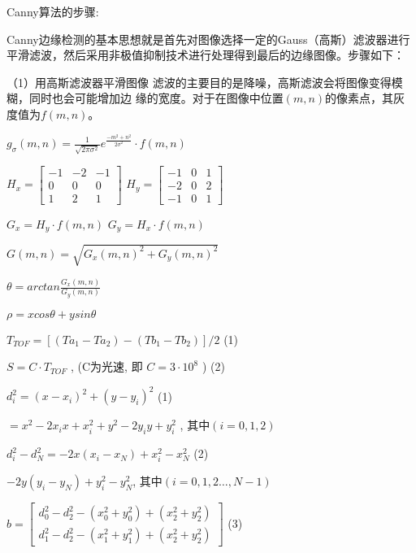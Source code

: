 Canny算法的步骤:

Canny边缘检测的基本思想就是首先对图像选择一定的Gauss（高斯）滤波器进行平滑滤波，然后采用非极值抑制技术进行处理得到最后的边缘图像。步骤如下：

（1）用高斯滤波器平滑图像
滤波的主要目的是降噪，高斯滤波会将图像变得模糊，同时也会可能增加边
缘的宽度。对于在图像中位置$(m,n)$的像素点，其灰度值为$f(m,n)$。

\bf{$g_{\sigma}(m,n) = \frac{1}{\sqrt{2\pi\sigma^2}} e^{\frac{-m^2+n^2}{2{\sigma^2}}} \cdot f(m,n) $}


$H_x = \begin{bmatrix} -1 & -2 & -1 \\ 0 & 0 & 0  \\ 1 & 2 & 1\end{bmatrix}$ \quad{}
$H_y = \begin{bmatrix} -1 & 0 & 1 \\ -2 & 0 & 2  \\ -1 & 0 & 1\end{bmatrix}$

$ G_x = H_y \cdot f(m,n)$ \quad{} $ G_y = H_x \cdot f(m,n)$


$G(m,n) = \sqrt{G_x(m,n) ^2 + G_y(m,n)^2}$

$\theta = arctan \frac{G_x(m,n)}{G_y(m,n)} $

\quad{}

$\rho = xcos \theta +ysin \theta$

\quad{}

$T_{TOF} =[(Ta_1 - Ta_2) - (Tb_1 - Tb_2)] /2 $ \quad{}\quad{}(1)

\quad{}

$ S= C \cdot T_{TOF}$ , \quad{}(C为光速, 即 $C=3\cdot 10^8$ ) \quad{}\quad{}(2)

\quad{}

$d_i^2 = (x - x_i)^2 + (y - y_i)^2 $ \quad{}\quad{}(1)

\quad$ = x^2 -2x_ix + x_i^2 + y^2 - 2y_iy + y_i^2$ , \quad{}其中$(i = 0,1,2)$

\quad

$d_i^2 - d_N^2 = -2x(x_i - x_N) + x_i^2 -x_N^2 $ \quad{}\quad{}(2)

\quad\quad\quad\quad{} $- 2y(y_i-y_N) + y_i^2 - y_N^2$, \quad{}其中$(i = 0,1,2\dots, N-1)$

\quad{}

$b = \begin{bmatrix} d_0^2 - d_2^2 - (x_0^2 + y_0^2) + (x_2^2 + y_2^2) \\ d_1^2 - d_2^2 - (x_1^2 + y_1^2) + (x_2^2 + y_2^2) \end{bmatrix}$ \quad{}\quad{}(3)

